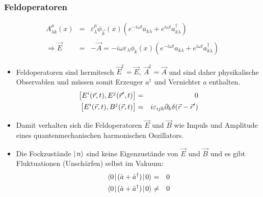 \subsubsection{Feldoperatoren}
\begin{eqnarray*}
	A^{\mu}_{\lambda k}(x)&=& \varepsilon_{\lambda}^{\mu} \phi_{\vec{k}}(x) \left( e^{-i\omega t} a_{k\lambda} +e^{i\omega t} a^\dagger_{k\lambda} \right)
\\
\Rightarrow \vec E &=& -\dot{\vec A} = -i\omega \varepsilon_{\lambda}\phi_k(x) \left( e^{-i\omega t} a_{k\lambda} +e^{i\omega t} a^\dagger_{k\lambda} \right)
\end{eqnarray*}
\begin{itemize}
\item Feldoperatoren sind hermitesch $\vec E^\dagger = \vec E, \ \vec A^\dagger = \vec A$ und sind daher physikalische Observablen und müssen somit Erzeuger $a^\dagger$ und Vernichter $a$ enthalten.
\begin{eqnarray*}
\left [E^i(\vec r, t),E^j(\vec r',t)\right] &=& 0\\
\left[E^i(\vec r, t), B^j(\vec r, t)\right] &=& i\varepsilon_{ijk}\partial_k\delta(\vec r-\vec r')
\end{eqnarray*}
\item Damit verhalten sich die Feldoperatoren $\vec{E}$ und $\vec{B}$ wie Impuls und Amplitude eines quantenmechanischen harmonischen Oszillators. 
\item Die Fockzustände $\mid\!\!\!\,\,{n}\rangle$ sind keine Eigenzustände von $\vec{E}$ und $\vec{B}$ und es gibt Fluktuationen (Unschärfen) selbst im Vakuum: 
\begin{eqnarray*}
	\bracket{0}{(\hat a+\hat a^\dagger)}{0}&=&0
	\\
	\bracket{0}{(\hat a+\hat a^\dagger)}{0}&\neq&0
\end{eqnarray*}
\end{itemize}


